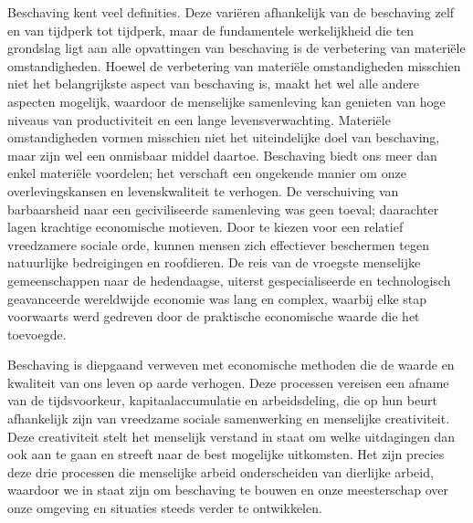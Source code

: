 Beschaving kent veel definities.\autocite{214} Deze variëren afhankelijk van de beschaving zelf en van tijdperk tot tijdperk, maar de fundamentele werkelijkheid die ten grondslag ligt aan alle opvattingen van beschaving is de verbetering van materiële omstandigheden. Hoewel de verbetering van materiële omstandigheden misschien niet het belangrijkste aspect van beschaving is, maakt het wel alle andere aspecten mogelijk, waardoor de menselijke samenleving kan genieten van hoge niveaus van productiviteit en een lange levensverwachting. Materiële omstandigheden vormen misschien niet het uiteindelijke doel van beschaving, maar zijn wel een onmisbaar middel daartoe. Beschaving biedt ons meer dan enkel materiële voordelen; het verschaft een ongekende manier om onze overlevingskansen en levenskwaliteit te verhogen. De verschuiving van barbaarsheid naar een geciviliseerde samenleving was geen toeval; daarachter lagen krachtige economische motieven. Door te kiezen voor een relatief vreedzamere sociale orde, kunnen mensen zich effectiever beschermen tegen natuurlijke bedreigingen en roofdieren. De reis van de vroegste menselijke gemeenschappen naar de hedendaagse, uiterst gespecialiseerde en technologisch geavanceerde wereldwijde economie was lang en complex, waarbij elke stap voorwaarts werd gedreven door de praktische economische waarde die het toevoegde.

Beschaving is diepgaand verweven met economische methoden die de waarde en kwaliteit van ons leven op aarde verhogen. Deze processen vereisen een afname van de tijdsvoorkeur, kapitaalaccumulatie en arbeidsdeling, die op hun beurt afhankelijk zijn van vreedzame sociale samenwerking en menselijke creativiteit. Deze creativiteit stelt het menselijk verstand in staat om welke uitdagingen dan ook aan te gaan en streeft naar de best mogelijke uitkomsten. Het zijn precies deze drie processen die menselijke arbeid onderscheiden van dierlijke arbeid, waardoor we in staat zijn om beschaving te bouwen en onze meesterschap over onze omgeving en situaties steeds verder te ontwikkelen.

